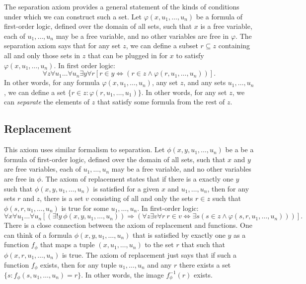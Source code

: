 \documentclass[11pt]{article}
\theoremstyle{definition}
\theoremstyle{remark}
\begin{document}
The separation axiom provides a general statement of the kinds of conditions under which we can construct such a set. Let $\varphi(x,u_{1},\dots,u_{n})$ be a formula of first-order logic, defined over the domain of all sets, such that $x$ is a free variable, each of $u_{1},\dots,u_{n}$ may be a free variable, and no other variables are free in $\varphi$. The separation axiom says that for any set $z$, we can define a subset $r\subseteq z$ containing all and only those sets in $z$ that can be plugged in for $x$ to satisfy $\varphi(x,u_{1},\dots,u_{n})$. In first order logic:
$$\forall z\forall u_{1}\dots\forall u_{n}\exists y \forall r \left[r\in y \iff \left(r\in z \wedge \varphi(r,u_{1},\dots,u_{n}) \right) \right].$$
In other words, for any formula $\varphi(x,u_{1},\dots,u_{n})$, any set $z$, and any sets $u_{1},\dots,u_{n}$, we can define a set $\{r\in z : \varphi(r,u_{1},\dots,u_{1})\}$. In other words, for any set $z$, we can \textit{separate} the elements of $z$ that satisfy some formula from the rest of $z$. 

\subsection{Replacement}
This axiom uses similar formalism to separation. Let $\phi(x,y,u_{1},\dots,u_{n})$ be a be a formula of first-order logic, defined over the domain of all sets, such that $x$ and $y$ are free variables, each of $u_{1},\dots,u_{n}$ may be a free variable, and no other variables are free in $\phi$. The axiom of replacement states that if there is a exactly one $y$ such that $\phi(x,y,u_{1},\dots,u_{n})$ is satisfied for a given $x$ and $u_{1},\dots,u_{n}$, then for any sets $r$ and $z$, there is a set $v$ consisting of all and only the sets $r\in z$ such that $\phi(s,r,u_{1},\dots,u_{n})$ is true for some $u_{1},\dots,u_{n}$. In first-order logic:
$$\forall x\forall u_{1}\dots\forall u_{n}\left[\left(\exists!y \ \phi(x,y,u_{1},\dots,u_{n})\right)\Rightarrow \left(\forall z \exists v \forall r \ r\in v \iff \exists s (s\in z \wedge \varphi(s,r,u_{1},\dots,u_{n}))\right) \right].$$
There is a close connection between the axiom of replacement and functions. One can think of a formula $\phi(x,y,u_{1},\dots,u_{n})$ that is satisfied by exactly one $y$ as a function $f_{\phi}$ that maps a tuple $(x,u_{1},\dots,u_{n})$ to the set $r$ that such that $\phi(x,r,u_{1},\dots,u_{n})$ is true. The axiom of replacement just says that if such a function $f_{\phi}$ exists, then for any tuple $u_{1},\dots,u_{n}$ and any $r$ there exists a set $\{s:f_{\phi}(s,u_{1},\dots,u_{n})=r\}$. In other words, the image $f^{-1}_{\phi}(r)$ exists.\par 
\end{document}
